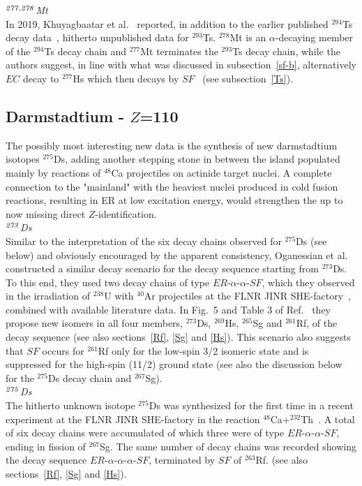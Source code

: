 {\it $^{\it277,278}$Mt}\\
In 2019, Khuyagbaatar et al.~\cite{Khuyagbaatar2019} reported, in addition to the earlier published $^{294}$Ts decay data~\cite{Khuyagbaatar2014}, hitherto unpublished data for $^{293}$Ts. $^{278}$Mt is an $\alpha$-decaying member of the $^{294}$Ts decay chain and $^{277}$Mt terminates the $^{293}$Ts decay chain, while the authors suggest, in line with what was discussed in subsection~\ref{sf-b}, alternatively $EC$ decay to $^{277}$Hs which then decays by $SF$~\cite{Khuyagbaatar2019} (see subsection~\ref{Ts}).

\subsection{Darmstadtium - $Z$=110}\label{Ds}
The possibly most interesting new data is the synthesis of new darmstadtium isotopes $^{275}$Ds, adding another stepping stone in between the island populated mainly by reactions of $^{48}$Ca projectiles on actinide target nuclei. 
A complete connection to the "mainland" with the heaviest nuclei produced in cold fusion reactions, resulting in ER at low excitation energy, would strengthen the up to now missing direct $Z$-identification.\\

{\it $^{\it273}$Ds}\\
Similar to the interpretation of the six decay chains observed for $^{275}$Ds (see below) and obviously encouraged by the apparent consistency, Oganessian et al. constructed a similar decay scenario for the decay sequence starting from $^{273}$Ds. 
To this end, they used two decay chains of type $ER$-$\alpha$-$\alpha$-$SF$, which they observed in the irradiation of $^{238}$U with $^{40}$Ar projectiles at the FLNR JINR SHE-factory~\cite{Oganessian2024}, combined with available literature data. 
In Fig.~5 and Table 3 of Ref.~\cite{Oganessian2024} they propose new isomers in all four members, $^{273}$Ds, $^{269}$Hs, $^{265}$Sg and $^{261}$Rf, of the decay sequence (see also sections~\ref{Rf}, \ref{Sg} and \ref{Hs}).
This scenario also suggests that $SF$ occurs for $^{261}$Rf only for the low-spin 3/2 isomeric state and is suppressed for the high-spin (11/2) ground state (see also the discussion below for the $^{275}$Ds decay chain and $^{267}$Sg).\\

{\it $^{\it275}$Ds}\\
The hitherto unknown isotope $^{275}$Ds was synthesized for the first time in a recent experiment at the FLNR JINR SHE-factory in the reaction $^{48}$Ca+$^{232}$Th~\cite{Oganessian2024}.
A total of six decay chains were accumulated of which three were of type $ER$-$\alpha$-$\alpha$-$SF$, ending in fission of $^{267}$Sg. 
The same number of decay chains was recorded showing the decay sequence $ER$-$\alpha$-$\alpha$-$\alpha$-$SF$, terminated by $SF$ of  $^{263}$Rf. (see also sections~\ref{Rf}, \ref{Sg} and \ref{Hs}). 

